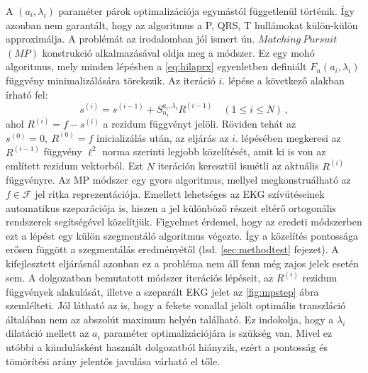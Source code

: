 \documentclass[oneside,titlepage,12pt,a4paper]{report}
\begin{document}
A $(a_i,\lambda_i)$ paraméter párok optimalizációja egymástól függetlenül történik. Így azonban nem garantált, hogy az algoritmus a P, QRS, T hullámokat külön-külön approximálja. A problémát az irodalomban jól ismert ún. $Matching\ Pursuit$ $(MP)$ konstrukció \cite{mpCikk} alkalmazásával oldja meg a módszer. Ez egy mohó algoritmus, mely minden lépésben a \eqref{eq:hilaprx} egyenletben definiált $F_n(a_i,\lambda_i)$ függvény minimalizálására törekszik. Az iteráció $i.$ lépése a következő alakban írható fel:
\begin{equation}
	s^{(i)}=s^{(i-1)} + S^{a_i,\lambda_i}_{n_i} R^{(i-1)} \quad (1\leq i \leq N)\,,
\label{eq:mpurs}
\end{equation}
ahol $R^{(i)}=f-s^{(i)}$ a rezidum függvényt jelöli. Röviden tehát az $s^{(0)}=0,\ R^{(0)}=f$ inicializálás után, az eljárás az $i.$ lépésében megkeresi az $R^{(i-1)}$ függvény $\ell^2$ norma szerinti legjobb közelítését, amit ki is von az említett rezidum vektorból. Ezt $N$ iteráción keresztül ismétli az aktuális $R^{(i)}$ függvényre. Az MP módszer egy gyors algoritmus, mellyel megkonstruálható az $f\in\mathcal{F}$ jel ritka reprezentációja. Emellett lehetséges az EKG szívütéseinek automatikus szeparációja is, hiszen a jel különböző részeit eltérő ortogonális rendszerek segítségével közelítjük. Figyelmet érdemel, hogy az eredeti \cite{origCikk} módszerben ezt a lépést egy külön szegmentáló algoritmus végezte. Így a közelítés pontossága erősen függött a szegmentálás eredményétől (lsd. \ref{sec:methodtest} fejezet). A kifejlesztett eljárásnál azonban ez a probléma nem áll fenn még zajos jelek esetén sem. A dolgozatban bemutatott módszer iterációs lépéseit, az $R^{(i)}$ rezidum függvények alakulását, illetve a szeparált EKG jelet az \ref{fig:mpstep} ábra szemlélteti. Jól látható az is, hogy a fekete vonallal jelölt optimális transzláció általában nem az abszolút maximum helyén található. Ez indokolja, hogy a $\lambda_i$ dilatáció mellett az $a_i$ paraméter optimalizációjára is szükség van. Mivel ez utóbbi a kiindulásként használt \cite{origCikk} dolgozatból hiányzik, ezért a pontosság és tömörítési arány jelentős javulása várható el tőle.
\end{document}
